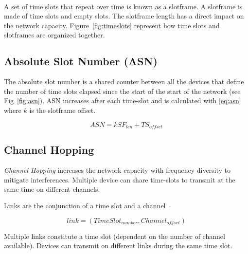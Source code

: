 \paragraph{}

A set of time slots that repeat over time is known as a slotframe.
A slotframe is made of time slots and empty slots.
The slotframe length has a direct impact on the network capacity.
Figure~\ref{fig:timeslots} represent how time slots and slotframes are
organized together. 



\subsection{Absolute Slot Number (ASN)}

The absolute slot number is a shared counter between all the devices that
define the number of time slots elapsed since the start of the start of the
network (see Fig~\ref{fig:asn}).
ASN increases after each time-slot and is calculated with \ref{eq:asn} where $k$
is the slotframe offset.

\begin{equation}
  \label{eq:asn}
  ASN = k SF_{len} + TS_{offset}
\end{equation}



\subsection{Channel Hopping}

\emph{Channel Hopping} increases the network capacity with frequency diversity
to mitigate interferences.
Multiple device can share time-slots to transmit at the same time on different
channels.

Links are the conjunction of a time slot and a channel~\cite{Chen2013PerformanceAO}.

\begin{equation}
  \label{eq:links}
  link = (TimeSlot_{number}, Channel_{offset})
\end{equation}

Multiple links constitute a time slot (dependent on the number of channel
available). Devices can transmit on different links during the same time slot.


